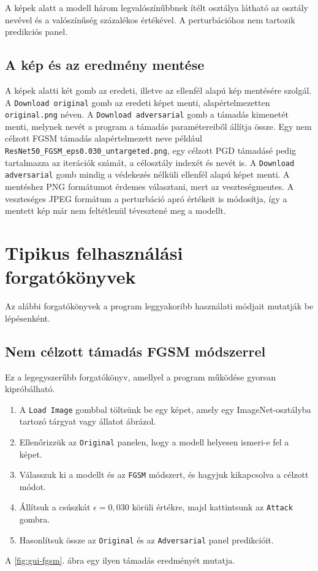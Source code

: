 A képek alatt a modell három legvalószínűbbnek ítélt osztálya látható 
az osztály nevével és a valószínűség százalékos értékével. 
A perturbációhoz nem tartozik predikciós panel. 

\subsection{A kép és az eredmény mentése}
A képek alatti két gomb az eredeti, illetve az ellenfél alapú kép mentésére szolgál. 
A \texttt{Download original} gomb az eredeti képet menti, alapértelmezetten \texttt{original.png} néven. 
A \texttt{Download adversarial} gomb a támadás kimenetét menti, melynek nevét a program a támadás paramétereiből állítja össze. 
Egy nem célzott FGSM támadás alapértelmezett neve például \texttt{ResNet50\_FGSM\_eps0.030\_untargeted.png}, egy célzott PGD 
támadásé pedig tartalmazza az iterációk számát, a célosztály indexét és nevét is. 
A \texttt{Download adversarial} gomb mindig a védekezés nélküli ellenfél alapú képet menti. 
A mentéshez PNG formátumot érdemes választani, mert az veszteségmentes. 
A veszteséges JPEG formátum a perturbáció apró értékeit is módosítja, így a mentett kép már nem feltétlenül tévesztené meg a 
modellt. 

\section{Tipikus felhasználási forgatókönyvek}
Az alábbi forgatókönyvek a program leggyakoribb használati módjait mutatják be lépésenként. 

\subsection{Nem célzott támadás FGSM módszerrel}
Ez a legegyszerűbb forgatókönyv, amellyel a program működése gyorsan kipróbálható. 
\begin{enumerate}
  \item A \texttt{Load Image} gombbal töltsünk be egy képet, amely egy ImageNet-osztályba tartozó tárgyat vagy állatot ábrázol. 
  \item Ellenőrizzük az \texttt{Original} panelen, hogy a modell helyesen ismeri-e fel a képet. 
  \item Válasszuk ki a modellt és az \texttt{FGSM} módszert, és hagyjuk kikapcsolva a célzott módot. 
  \item Állítsuk a csúszkát $\epsilon = 0{,}030$ körüli értékre, majd kattintsunk az \texttt{Attack} gombra. 
  \item Hasonlítsuk össze az \texttt{Original} és az \texttt{Adversarial} panel predikcióit. 
\end{enumerate}
A \ref{fig:gui-fgsm}. ábra egy ilyen támadás eredményét mutatja. 

